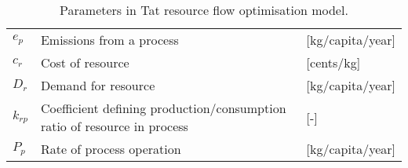 	\begin{table}[h]
		\centering
		\caption{Parameters in Tat resource flow optimisation model.} \label{tab:tat_params}
			\begin{tabular}{lll}
			\toprule
			$e_p$ & Emissions from a process & [kg/capita/year] \\
		        $c_r$ & Cost of resource & [cents/kg] \\		
			$D_r$ & Demand for resource & [kg/capita/year] \\
			$k_{rp}$ & Coefficient defining production/consumption ratio of resource in process & [-] \\
			$P_p$ & Rate of process operation & [kg/capita/year]\\
			\bottomrule
			\end{tabular}
	\end{table}

